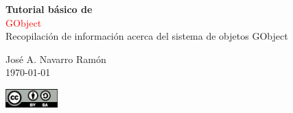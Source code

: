 %

\newcommand*{\titleTH}{\begingroup%
\raggedleft
\vspace*{\baselineskip}
{\bfseries\Large Tutorial básico de}\\[\baselineskip]
{\textcolor{red}{\Huge GObject}}\\[\baselineskip]
{\normalsize Recopilación de información acerca del sistema de objetos \textsf{GObject}}\par
\vspace{5ex}
\par
{\Large José A. Navarro Ramón}\\[0.167\textheight]
\today\par
\vspace{2ex}
{\Large \includegraphics[width=2.0cm]{./img/by-sa.eps}}\par
\vspace*{3\baselineskip}
\endgroup}

\titleTH



